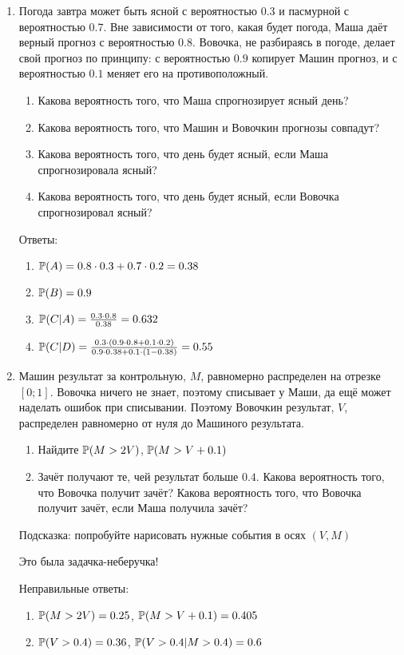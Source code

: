 \documentclass[pdftex,12pt,a4paper]{article}
\begin{document}
\begin{enumerate}

\item Погода завтра может быть ясной с вероятностью $0.3$ и пасмурной с вероятностью $0.7$. Вне зависимости от того, какая будет погода, Маша даёт верный прогноз с вероятностью $0.8$. Вовочка, не разбираясь в погоде, делает свой прогноз по принципу: с вероятностью $0.9$ копирует Машин прогноз, и с вероятностью $0.1$ меняет его на противоположный. 
\begin{enumerate}
\item Какова вероятность того, что Маша спрогнозирует ясный день?
\item Какова вероятность того, что Машин и Вовочкин прогнозы совпадут?
\item Какова вероятность того, что день будет ясный, если Маша спрогнозировала ясный?
\item Какова вероятность того, что день будет ясный, если Вовочка спрогнозировал ясный?
\end{enumerate} 

Ответы:
\begin{enumerate}
\item $\P(A)=0.8\cdot 0.3+0.7\cdot 0.2=0.38$
\item $\P(B)=0.9$
\item $\P(C|A)=\frac{0.3\cdot 0.8}{0.38}=0.632$
\item $\P(C|D)=\frac{0.3\cdot (0.9\cdot 0.8+0.1\cdot 0.2)}{0.9\cdot 0.38+0.1\cdot (1-0.38)}=0.55$
\end{enumerate}


\item Машин результат за контрольную, $M$, равномерно распределен на отрезке $[0;1]$. Вовочка ничего не знает, поэтому списывает у Маши, да ещё может наделать ошибок при списывании. Поэтому Вовочкин результат, $V$, распределен равномерно от нуля до Машиного результата.  
\begin{enumerate}
\item Найдите $\P(M>2V)$, $\P(M>V+0.1)$
\item Зачёт получают те, чей результат больше $0.4$. Какова вероятность того, что Вовочка получит зачёт? Какова вероятность того, что Вовочка получит зачёт, если Маша получила зачёт? 
\end{enumerate}
Подсказка: попробуйте нарисовать нужные события в осях $(V,M)$

Это была задачка-неберучка! 

Неправильные ответы:
\begin{enumerate}
\item $\P(M>2V)=0.25$, $\P(M>V+0.1)=0.405$
\item $\P(V>0.4)=0.36$, $\P(V>0.4|M>0.4)=0.6$
\end{enumerate}




\end{enumerate}
\end{document}
